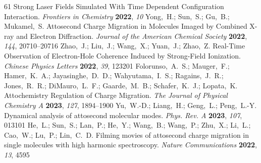 \documentclass[journal=jacsat,manuscript=article]{achemso}
\begin{document}
\begin{mcitethebibliography}{61}
  Strong Laser Fields Simulated With Time Dependent Configuration Interaction.
  \emph{Frontiers in Chemistry} \textbf{2022}, \emph{10}\relax
\mciteBstWouldAddEndPuncttrue
\mciteSetBstMidEndSepPunct{\mcitedefaultmidpunct}
{\mcitedefaultendpunct}{\mcitedefaultseppunct}\relax
\EndOfBibitem
{}
Yong,~H.; Sun,~S.; Gu,~B.; Mukamel,~S. Attosecond Charge Migration in Molecules
  Imaged by Combined X-ray and Electron Diffraction. \emph{Journal of the
  American Chemical Society} \textbf{2022}, \emph{144}, 20710--20716\relax
\mciteBstWouldAddEndPuncttrue
\mciteSetBstMidEndSepPunct{\mcitedefaultmidpunct}
{\mcitedefaultendpunct}{\mcitedefaultseppunct}\relax
\EndOfBibitem
{}
Zhao,~J.; Liu,~J.; Wang,~X.; Yuan,~J.; Zhao,~Z. Real-Time Observation of
  Electron-Hole Coherence Induced by Strong-Field Ionization. \emph{Chinese
  Physics Letters} \textbf{2022}, \emph{39}, 123201\relax
\mciteBstWouldAddEndPuncttrue
\mciteSetBstMidEndSepPunct{\mcitedefaultmidpunct}
{\mcitedefaultendpunct}{\mcitedefaultseppunct}\relax
\EndOfBibitem
{}
Folorunso,~A.~S.; Mauger,~F.; Hamer,~K.~A.; Jayasinghe,~D.~D.;
  Wahyutama,~I.~S.; Ragains,~J.~R.; Jones,~R.~R.; DiMauro,~L.~F.;
  Gaarde,~M.~B.; Schafer,~K.~J.; Lopata,~K. Attochemistry Regulation of Charge
  Migration. \emph{The Journal of Physical Chemistry A} \textbf{2023},
  \emph{127}, 1894--1900\relax
\mciteBstWouldAddEndPuncttrue
\mciteSetBstMidEndSepPunct{\mcitedefaultmidpunct}
{\mcitedefaultendpunct}{\mcitedefaultseppunct}\relax
\EndOfBibitem
{}
Yu,~W.-D.; Liang,~H.; Geng,~L.; Peng,~L.-Y. Dynamical analysis of attosecond
  molecular modes. \emph{Phys. Rev. A} \textbf{2023}, \emph{107}, 013101\relax
\mciteBstWouldAddEndPuncttrue
\mciteSetBstMidEndSepPunct{\mcitedefaultmidpunct}
{\mcitedefaultendpunct}{\mcitedefaultseppunct}\relax
\EndOfBibitem
{}
He,~L.; Sun,~S.; Lan,~P.; He,~Y.; Wang,~B.; Wang,~P.; Zhu,~X.; Li,~L.; Cao,~W.;
  Lu,~P.; Lin,~C.~D. Filming movies of attosecond charge migration in single
  molecules with high harmonic spectroscopy. \emph{Nature Communications}
  \textbf{2022}, \emph{13}, 4595\relax
\mciteBstWouldAddEndPuncttrue
\mciteSetBstMidEndSepPunct{\mcitedefaultmidpunct}

\end{mcitethebibliography}
\end{document}
